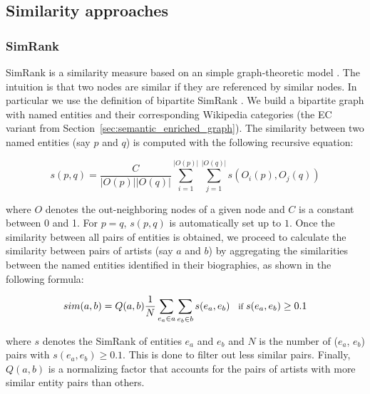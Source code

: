 \subsection{Similarity approaches}

\subsubsection{SimRank} %

SimRank is a similarity measure based on an simple graph-theoretic model \cite{jeh2002simrank}. The intuition is that two nodes are similar if they are referenced by similar nodes. In particular we use the definition of bipartite SimRank \cite{jeh2002simrank}. We build a bipartite graph with named entities and their corresponding Wikipedia categories (the EC variant from Section~\ref{sec:semantic_enriched_graph}). The similarity between two named entities (say $p$ and $q$) is computed with the following recursive equation:

\begin{equation}
s(p,q) = \frac{C}{|O(p)||O(q)|} \sum_{i=1}^{|O(p)|} \sum_{j=1}^{|O(q)|} s(O_i(p), O_j(q))
\end{equation}

where $O$ denotes the out-neighboring nodes of a given node and $C$ is a constant between 0 and 1. For $p = q$, $s(p,q)$ is automatically set up to $1$.
Once the similarity between all pairs of entities is obtained, we proceed to calculate the similarity between pairs of artists (say $a$ and $b$) by aggregating the similarities between the named entities identified in their biographies, as shown in the following formula:

\begin{equation}
\footnotesize
sim(a,b) = Q(a,b) \frac{1}{N} \sum_{e_a \in a} \sum_{e_b \in b} s(e_a, e_b)\quad \text{if}\ s(e_a, e_b) \geq 0.1
\end{equation}

where $s$ denotes the SimRank of entities $e_a$ and $e_b$ and $N$ is the number of ($e_a$, $e_b$) pairs with $s(e_a, e_b) \geq 0.1$. This is done to filter out less similar pairs.
%
Finally, $Q(a,b)$ is a normalizing factor that accounts for the pairs of artists with more similar entity pairs than others.

%


